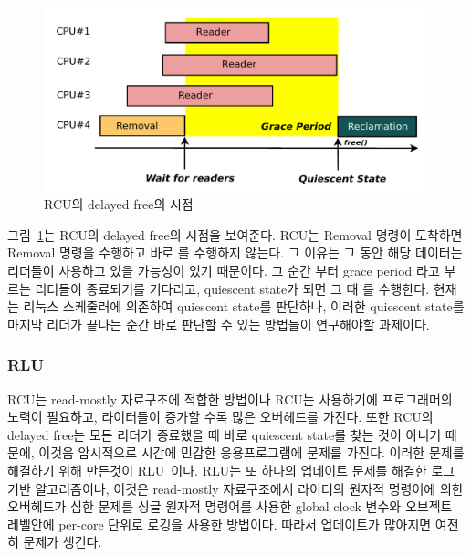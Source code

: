 \begin{figure}[h]
    \centering
    \includegraphics[width=1\textwidth]{fig/rcu/rcu_grace}
    \caption{RCU의 delayed free의 시점}
  \label{fig:rcu_grace}
\end{figure}

그림~\ref{fig:rcu_grace}는 RCU의 delayed free의 시점을 보여준다.
RCU는 Removal 명령이 도착하면  Removal 명령을 수행하고 바로 를 수행하지 않는다. 
그 이유는 그 동안 해당 데이터는 리더들이 사용하고 있을 가능성이 있기 때문이다.
그 순간 부터 grace period 라고 부르는 리더들이 종료되기를 기다리고, quiescent state가 되면 
그 때 를 수행한다. 
현재는 리눅스 스케줄러에 의존하여 quiescent state를 판단하나, 
이러한  quiescent state를 마지막 리더가 끝나는 순간 바로 판단할 수 있는 방법들이 연구해야할 과제이다. 

\subsubsection{RLU}

RCU는 read-mostly 자료구조에 적합한 방법이나 
RCU는 사용하기에 프로그래머의 노력이 필요하고, 라이터들이 증가할 수록 많은 오버헤드를 가진다.
또한 RCU의 delayed free는 모든 리더가 종료했을 때 바로 quiescent state를 찾는 것이 아니기 때문에, 
이것음 암시적으로 시간에 민감한 응용프로그램에 문제를 가진다. 
이러한 문제를 해결하기 위해 만든것이 RLU~\cite{Matveev2015RLU}이다. 
RLU는 또 하나의 업데이트 문제를 해결한 
로그 기반 알고리즘이나, 이것은 read-mostly 자료구조에서 라이터의 원자적 명령어에 의한
오버헤드가 심한 문제를 싱글 원자적 명령어를 사용한 global clock 변수와 
오브젝트 레벨안에 per-core 단위로 로깅을 사용한 방법이다. 
따라서 업데이트가 많아지면 여전히 문제가 생긴다.


